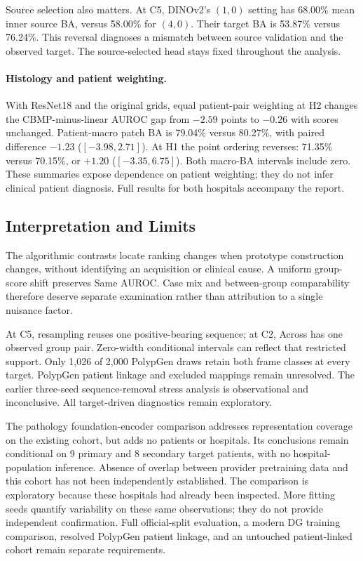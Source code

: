 


Source selection also matters. At C5, DINOv2's $(1,0)$ setting has 68.00\% mean inner source BA, versus 58.00\% for $(4,0)$. Their target BA is 53.87\% versus 76.24\%. This reversal diagnoses a mismatch between source validation and the observed target. The source-selected head stays fixed throughout the analysis.


\paragraph{Histology and patient weighting.}
With ResNet18 and the original grids, equal patient-pair weighting at H2 changes the CBMP-minus-linear AUROC gap from $-2.59$ points to $-0.26$ with scores unchanged. Patient-macro patch BA is 79.04\% versus 80.27\%, with paired difference $-1.23$ ($[-3.98,2.71]$). At H1 the point ordering reverses: 71.35\% versus 70.15\%, or $+1.20$ ($[-3.35,6.75]$). Both macro-BA intervals include zero. These summaries expose dependence on patient weighting; they do not infer clinical patient diagnosis. Full results for both hospitals accompany the report.


\subsection{Interpretation and Limits}
The algorithmic contrasts locate ranking changes when prototype construction changes, without identifying an acquisition or clinical cause. A uniform group-score shift preserves Same AUROC. Case mix and between-group comparability therefore deserve separate examination rather than attribution to a single nuisance factor.

At C5, resampling reuses one positive-bearing sequence; at C2, Across has one observed group pair. Zero-width conditional intervals can reflect that restricted support. Only 1,026 of 2,000 PolypGen draws retain both frame classes at every target. PolypGen patient linkage and excluded mappings remain unresolved. The earlier three-seed sequence-removal stress analysis is observational and inconclusive. All target-driven diagnostics remain exploratory.

The pathology foundation-encoder comparison addresses representation coverage on the existing cohort, but adds no patients or hospitals. Its conclusions remain conditional on 9 primary and 8 secondary target patients, with no hospital-population inference. Absence of overlap between provider pretraining data and this cohort has not been independently established. The comparison is exploratory because these hospitals had already been inspected. More fitting seeds quantify variability on these same observations; they do not provide independent confirmation. Full official-split evaluation, a modern DG training comparison, resolved PolypGen patient linkage, and an untouched patient-linked cohort remain separate requirements.


